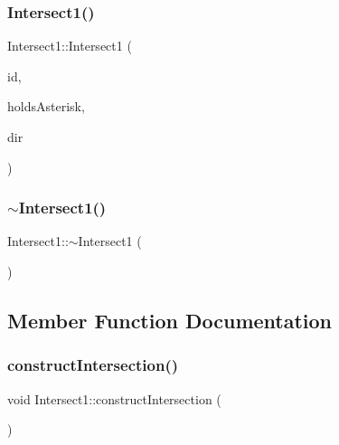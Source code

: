 \subsubsection{\texorpdfstring{Intersect1()}{Intersect1()}\hspace{0.1cm}{\footnotesize\ttfamily [2/2]}}
{\footnotesize\ttfamily Intersect1\+::\+Intersect1 (\begin{DoxyParamCaption}\item[{char}]{id,  }\item[{bool}]{holds\+Asterisk,  }\item[{\hyperlink{vehicle_8h_ab81942edaa6e6c3f12551c3d0e511b85}{Vehicle\+Dir}}]{dir }\end{DoxyParamCaption})}

\hypertarget{class_intersect1_a75061672aac2df5e20f6c8d3ead60833}{}\label{class_intersect1_a75061672aac2df5e20f6c8d3ead60833} 
\subsubsection{\texorpdfstring{$\sim$\+Intersect1()}{~Intersect1()}}
{\footnotesize\ttfamily Intersect1\+::$\sim$\+Intersect1 (\begin{DoxyParamCaption}{ }\end{DoxyParamCaption})}



\subsection{Member Function Documentation}
\hypertarget{class_intersect1_a3a79b2e996c2016783b1402c55fdd031}{}\label{class_intersect1_a3a79b2e996c2016783b1402c55fdd031} 
\subsubsection{\texorpdfstring{construct\+Intersection()}{constructIntersection()}}
{\footnotesize\ttfamily void Intersect1\+::construct\+Intersection (\begin{DoxyParamCaption}{ }\end{DoxyParamCaption})\hspace{0.3cm}{\ttfamily [private]}}

